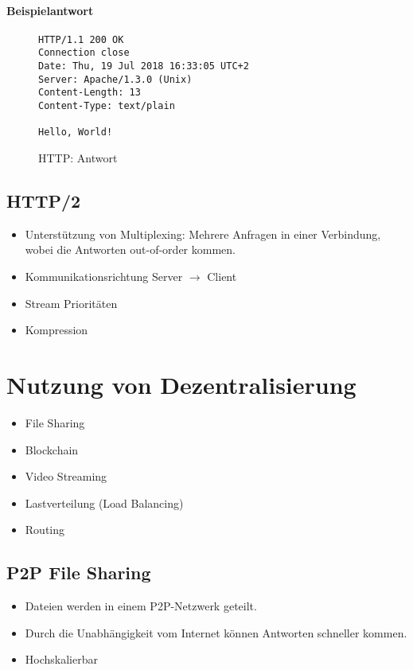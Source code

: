 			\paragraph{Beispielantwort}
				\begin{figure}[H]
					\centering
					\begin{lstlisting}
HTTP/1.1 200 OK
Connection close
Date: Thu, 19 Jul 2018 16:33:05 UTC+2
Server: Apache/1.3.0 (Unix)
Content-Length: 13
Content-Type: text/plain

Hello, World!
                	\end{lstlisting}
					\caption{HTTP: Antwort}
				\end{figure}

		\subsection{HTTP/2} %
			\begin{itemize}
				\item Unterstützung von Multiplexing: Mehrere Anfragen in einer Verbindung, wobei die Antworten out-of-order kommen.
				\item Kommunikationsrichtung Server \(\rightarrow\) Client
				\item Stream Prioritäten
				\item Kompression
			\end{itemize}

	\section{Nutzung von Dezentralisierung}
		\begin{itemize}
			\item File Sharing
			\item Blockchain
			\item Video Streaming
			\item Lastverteilung (Load Balancing)
			\item Routing
		\end{itemize}

		\subsection{P2P File Sharing}
			\begin{itemize}
				\item Dateien werden in einem P2P-Netzwerk geteilt.
				\item Durch die Unabhängigkeit vom Internet können Antworten schneller kommen.
				\item Hochskalierbar
			\end{itemize}

